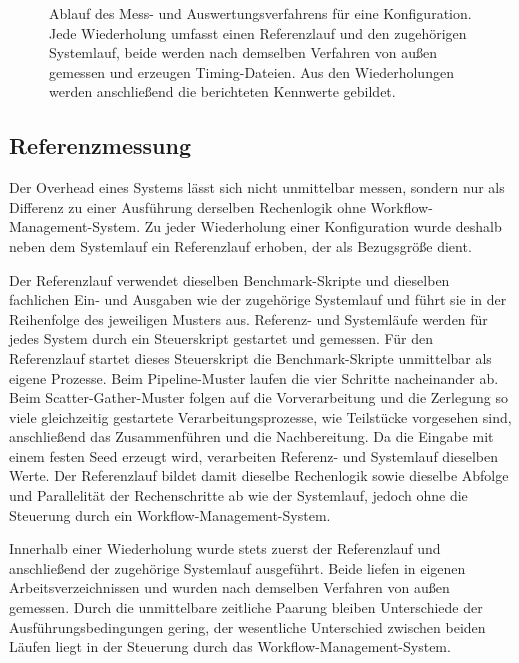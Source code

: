 \begin{figure}[H]
  \caption{Ablauf des Mess- und Auswertungsverfahrens für eine Konfiguration. Jede Wiederholung umfasst einen Referenzlauf und den zugehörigen Systemlauf, beide werden nach demselben Verfahren von außen gemessen und erzeugen Timing-Dateien. Aus den Wiederholungen werden anschließend die berichteten Kennwerte gebildet.}
  \label{fig:methodik:messung}
\end{figure}

\subsection{Referenzmessung}
\label{sec:methodik:referenz}

Der Overhead eines Systems lässt sich nicht unmittelbar messen,
sondern nur als Differenz zu einer Ausführung derselben Rechenlogik
ohne Workflow-Management-System. Zu jeder Wiederholung einer
Konfiguration wurde deshalb neben dem Systemlauf ein Referenzlauf
erhoben, der als Bezugsgröße dient.

Der Referenzlauf verwendet dieselben Benchmark-Skripte und
dieselben fachlichen Ein- und Ausgaben wie der zugehörige
Systemlauf und führt sie in der Reihenfolge des jeweiligen Musters
aus. Referenz- und Systemläufe werden für jedes System durch ein
Steuerskript gestartet und gemessen. Für den Referenzlauf startet
dieses Steuerskript die Benchmark-Skripte unmittelbar als eigene
Prozesse. Beim Pipeline-Muster laufen die vier Schritte
nacheinander ab. Beim Scatter-Gather-Muster folgen auf die
Vorverarbeitung und die Zerlegung so viele gleichzeitig gestartete
Verarbeitungsprozesse, wie Teilstücke vorgesehen sind, anschließend
das Zusammenführen und die Nachbereitung. Da die Eingabe mit einem
festen Seed erzeugt wird, verarbeiten Referenz- und Systemlauf
dieselben Werte. Der Referenzlauf bildet damit dieselbe Rechenlogik
sowie dieselbe Abfolge und Parallelität der Rechenschritte ab wie
der Systemlauf, jedoch ohne die Steuerung durch ein
Workflow-Management-System.

Innerhalb einer Wiederholung wurde stets zuerst der Referenzlauf
und anschließend der zugehörige Systemlauf ausgeführt. Beide liefen
in eigenen Arbeitsverzeichnissen und wurden nach demselben
Verfahren von außen gemessen. Durch die unmittelbare zeitliche
Paarung bleiben Unterschiede der Ausführungsbedingungen gering, der
wesentliche Unterschied zwischen beiden Läufen liegt in der
Steuerung durch das Workflow-Management-System.

